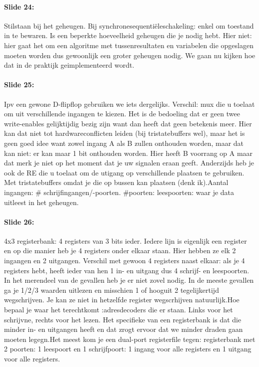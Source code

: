 \documentclass[10pt,a4paper]{book}
\begin{document}
\paragraph{Slide 24:} Stilstaan bij het geheugen. Bij synchronesequenti\"eleschakeling: enkel om toestand in te bewaren. Is een beperkte hoeveelheid geheugen die je nodig hebt. Hier niet: hier gaat het om een algoritme met tussenresultaten en variabelen die opgeslagen moeten worden dus gewoonlijk een groter geheugen nodig. We gaan nu kijken hoe dat in de praktijk geimplementeerd wordt. 

\paragraph{Slide 25:} Ipv een gewone D-flipflop gebruiken we iets dergelijks. Verschil: mux die u toelaat om uit verschillende ingangen te kiezen. Het is de bedoeling dat er geen twee write-enables gelijktijdig bezig zijn want dan heeft dat geen betekenis meer. Hier kan dat niet tot hardwareconflicten leiden (bij tristatebuffers wel), maar het is geen goed idee want zowel ingang A als B zullen onthouden worden, maar dat kan niet: er kan maar 1 bit onthouden worden. Hier heeft B voorrang op A maar dat merk je niet op het moment dat je uw signalen eraan geeft. Anderzijds heb je ook de RE die u toelaat om de utigang op verschillende plaatsen te gebruiken. Met tristatebuffers omdat je die op bussen kan plaatsen (denk ik).Aantal ingangen: \# schrijfingangen/-poorten. \#poorten: leespoorten: waar je data uitleest in het geheugen.

\paragraph{Slide 26:} 4x3 registerbank: 4 registers van 3 bits ieder. Iedere lijn is eigenlijk een register en op die manier heb je 4 registers onder elkaar staan. Hier hebben ze elk 2 ingangen en 2 uitgangen. Verschil met gewoon 4 registers naast elkaar: als je 4 registers hebt, heeft ieder van hen 1 in- en uitgang dus 4 schrijf- en leespoorten. In het merendeel van de gevallen heb je er niet zovel nodig. In de meeste gevallen ga je 1/2/3 waarden uitlezen en misschien 1 of hooguit 2 tegelijkertijd wegschrijven. Je kan ze niet in hetzelfde register wegscrhijven natuurlijk.Hoe bepaal je waar het terechtkomt :adresdecoders die er staan. Links voor het schrijvne, rechts voor het lezen. Het specifieke van een registerbank is dat die minder in- en uitgangen heeft en dat zrogt ervoor dat we minder draden gaan moeten legegn.Het meest kom je een dual-port registerfile tegen: registerbank met 2 poorten: 1 leespoort en 1 schrijfpoort: 1 ingang voor alle registers en 1 uitgang voor alle registers.
\end{document}
